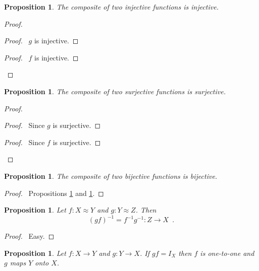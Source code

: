 \documentclass{report}
\let\qed\relax
\newtheorem{prop}[ax]{Proposition}
\theoremstyle{definition}
\begin{document}
\begin{prop}
\label{prop:comp_inj}
The composite of two injective functions is injective.
\end{prop}

\begin{proof}
\pf
{}
\begin{proof}
	\pf\ $g$ is injective.
\end{proof}
\begin{proof}
	\pf\ $f$ is injective.
\end{proof}
\qed
\end{proof}

\begin{prop}
\label{prop:comp_surj}
The composite of two surjective functions is surjective.
\end{prop}

\begin{proof}
\pf
{}
\begin{proof}
	\pf\ Since $g$ is surjective.
\end{proof}
\begin{proof}
	\pf\ Since $f$ is surjective.
\end{proof}
\qed
\end{proof}

\begin{prop}
The composite of two bijective functions is bijective.
\end{prop}

\begin{proof}
\pf\ Propositions \ref{prop:comp_inj} and \ref{prop:comp_surj}. \qed
\end{proof}

\begin{prop}
Let $f : X \approx Y$ and $g : Y \approx Z$. Then
\[ (gf)^{-1} = f^{-1}g^{-1} : Z \rightarrow X \enspace . \]
\end{prop}

\begin{proof}
\pf\ Easy. \qed
\end{proof}

\begin{prop}
\label{prop:inverse_injective_surjective}
Let $f : X \rightarrow Y$ and $g : Y \rightarrow X$. If $gf = I_X$ then $f$ is one-to-one and $g$ maps $Y$ onto $X$.
\end{prop}
\end{document}
